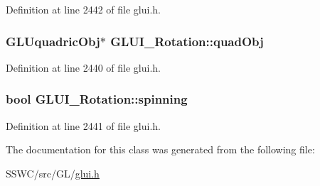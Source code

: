 Definition at line 2442 of file glui.\+h.

\hypertarget{class_g_l_u_i___rotation_af98f7b7cec5463b46b3ba1f685ef142c}{
\subsubsection[{quad\+Obj}]{\setlength{\rightskip}{0pt plus 5cm}G\+L\+Uquadric\+Obj$\ast$ G\+L\+U\+I\+\_\+\+Rotation\+::quad\+Obj}}\label{class_g_l_u_i___rotation_af98f7b7cec5463b46b3ba1f685ef142c}


Definition at line 2440 of file glui.\+h.

\hypertarget{class_g_l_u_i___rotation_a49f0172a0fe24adb308730664f083018}{
\subsubsection[{spinning}]{\setlength{\rightskip}{0pt plus 5cm}bool G\+L\+U\+I\+\_\+\+Rotation\+::spinning}}\label{class_g_l_u_i___rotation_a49f0172a0fe24adb308730664f083018}


Definition at line 2441 of file glui.\+h.



The documentation for this class was generated from the following file\+:\begin{DoxyCompactItemize}
\item 
S\+S\+W\+C/src/\+G\+L/\hyperlink{glui_8h}{glui.\+h}\end{DoxyCompactItemize}
